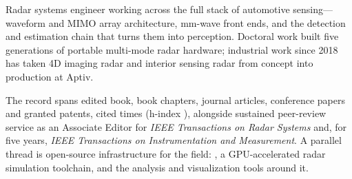 %
%


\begin{cvparagraph}
    Radar systems engineer working across the full stack of automotive sensing---waveform and MIMO array architecture, mm-wave front ends, and the detection and estimation chain that turns them into perception. Doctoral work built five generations of portable multi-mode radar hardware; industrial work since 2018 has taken 4D imaging radar and interior sensing radar from concept into production at Aptiv.

    \vspace{1.4mm}
    The record spans \cvBooks{} edited book, \cvChapters{} book chapters, \cvJournals{} journal articles, \cvConfPapers{} conference papers and \cvPatents{} granted patents, cited \cvCitations{} times (h-index \cvHIndex), alongside sustained peer-review service as an Associate Editor for \emph{IEEE Transactions on Radar Systems} and, for five years, \emph{IEEE Transactions on Instrumentation and Measurement}. A parallel thread is open-source infrastructure for the field: , a GPU-accelerated radar simulation toolchain, and the analysis and visualization tools around it.
\end{cvparagraph}
